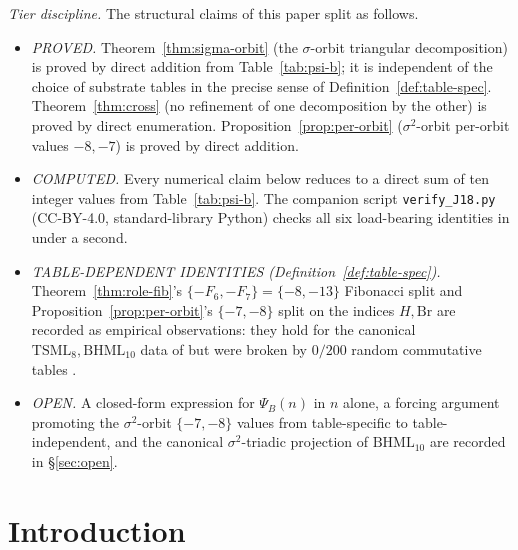 \documentclass[11pt,reqno]{amsart}
\theoremstyle{plain}
\theoremstyle{definition}
\theoremstyle{remark}
\newcommand{\TS}{\mathrm{TSML}}
\newcommand{\BH}{\mathrm{BHML}}
\newcommand{\sig}{\sigma}
\begin{document}
\emph{Tier discipline.}  The structural claims of this paper split as
follows.
\begin{itemize}
\item \emph{PROVED.}  Theorem~\ref{thm:sigma-orbit} (the $\sig$-orbit
triangular decomposition) is proved by direct addition from
Table~\ref{tab:psi-b}; it is independent of the choice of
substrate tables in the precise sense of Definition~\ref{def:table-spec}.
Theorem~\ref{thm:cross} (no refinement of one decomposition by the
other) is proved by direct enumeration.  Proposition~\ref{prop:per-orbit}
($\sig^{2}$-orbit per-orbit values $-8, -7$) is proved by direct
addition.
\item \emph{COMPUTED.}  Every numerical claim below reduces to a
direct sum of ten integer values from Table~\ref{tab:psi-b}.  The
companion script \texttt{verify\_J18.py} (CC-BY-4.0, standard-library
Python) checks all six load-bearing identities in under a second.
\item \emph{TABLE-DEPENDENT IDENTITIES (Definition~\ref{def:table-spec}).}
Theorem~\ref{thm:role-fib}'s $\{-F_{6}, -F_{7}\} = \{-8, -13\}$
Fibonacci split and Proposition~\ref{prop:per-orbit}'s
$\{-7, -8\}$ split on the indices $H, \mathrm{Br}$ are recorded
as empirical observations: they hold for the canonical
$\TS_{8}, \BH_{10}$ data of \cite{SandersGishFourCore} but were
broken by $0/200$ random commutative tables \cite[N8]{SandersBridgeWP9}.
\item \emph{OPEN.}  A closed-form expression for $\Psi_{B}(n)$ in $n$
alone, a forcing argument promoting the $\sig^{2}$-orbit
$\{-7, -8\}$ values from table-specific to table-independent, and the
canonical $\sig^{2}$-triadic projection of $\BH_{10}$ are recorded
in \S\ref{sec:open}.
\end{itemize}

\section{Introduction}
\end{document}
